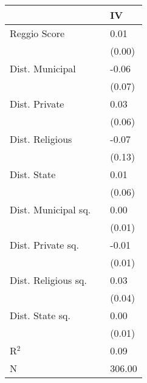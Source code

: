 \begin{tabular}{l L{1cm} l}
\toprule
 & & IV \\
\midrule
Reggio Score & & 0.01 \\
& & (0.00) \\
Dist. Municipal & & -0.06 \\
& & (0.07) \\
Dist. Private & & 0.03 \\
& & (0.06) \\
Dist. Religious & & -0.07 \\
& & (0.13) \\
Dist. State & & 0.01 \\
& & (0.06) \\
Dist. Municipal sq. & & 0.00 \\
& & (0.01) \\
Dist. Private sq. & & -0.01 \\
& & (0.01) \\
Dist. Religious sq. & & 0.03 \\
& & (0.04) \\
Dist. State sq. & & 0.00 \\
& & (0.01) \\
\midrule
R$^2$ & & 0.09 \\
N & & 306.00 \\
\bottomrule
\end{tabular}
